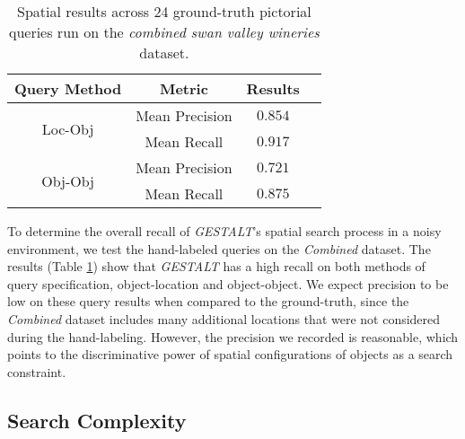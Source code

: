 \small{
\begin{table}[h!]
    \begin{center}
        \begin{tabular}{ |c|c|c|c| } 
            \hline
            Query Method & Metric & Results \\
            \hline
            \multirow{2}{7em}{Loc-Obj} & Mean Precision & $0.854$ \\
            & Mean Recall & $0.917$\\%
            \hline     
            \multirow{2}{7em}{Obj-Obj} & Mean Precision & $0.721$ \\ 
            &Mean Recall & $0.875$ \\
            \hline
        \end{tabular}
        \caption{Spatial results across 24 ground-truth pictorial queries run on the \textit{combined swan valley wineries} dataset.} %
        \label{Table:GroundTruth}
    \end{center}
\end{table}
}

To determine the overall recall of \emph{GESTALT}'s spatial search process in a noisy environment, we test the hand-labeled queries on the \textit{Combined} dataset.
The results (Table \ref{Table:GroundTruth}) show that \emph{GESTALT} has a high recall on both methods of query specification, object-location and object-object.
We expect precision to be low on these query results when compared to the ground-truth, since the \textit{Combined} dataset includes many additional locations that were not considered during the hand-labeling.
However, the precision we recorded is reasonable, which points to the discriminative power of spatial configurations of objects as a search constraint.


\subsection{Search Complexity}

